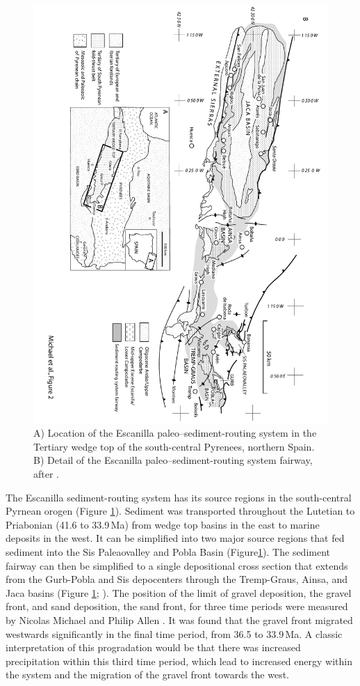 \begin{figure}
\includegraphics[height=\textwidth,angle=90]{./figures/ch2-escanilla-map.pdf}
\caption{A) Location of the Escanilla paleo--sediment-routing system in the Tertiary wedge top of the south-central Pyrenees, northern Spain. B) Detail of the Escanilla paleo--sediment-routing system fairway, after \cite{michael-etal-2014a}.}
\label{fg:escanilla-map}
\end{figure}

The Escanilla sediment-routing system has its source regions in the south-central Pyrnean orogen (Figure \ref{fg:escanilla-map}). Sediment was transported throughout the Lutetian to Priabonian (41.6 to 33.9\,Ma) from wedge top basins in the east to marine deposits in the west. It can be simplified into two major source regions that fed sediment into the Sis Paleaovalley and Pobla Basin (Figure\ref{fg:escanilla-map}). The sediment fairway can then be simplified to a single depositional cross section that extends from the Gurb-Pobla and Sis depocenters through the Tremp-Graus, Ainsa, and Jaca basins (Figure \ref{fg:escanilla-map}; \citealp{michael-etal-2013}). The position of the limit of gravel deposition, the gravel front, and sand deposition, the sand front, for three time periods were measured by Nicolas Michael and Philip Allen \citep{michael-etal-2013}. It was found that the gravel front migrated westwards significantly in the final time period, from 36.5 to 33.9\,Ma. A classic interpretation of this progradation would be that there was increased precipitation within this third time period, which lead to increased energy within the system and the migration of the gravel front towards the west.

